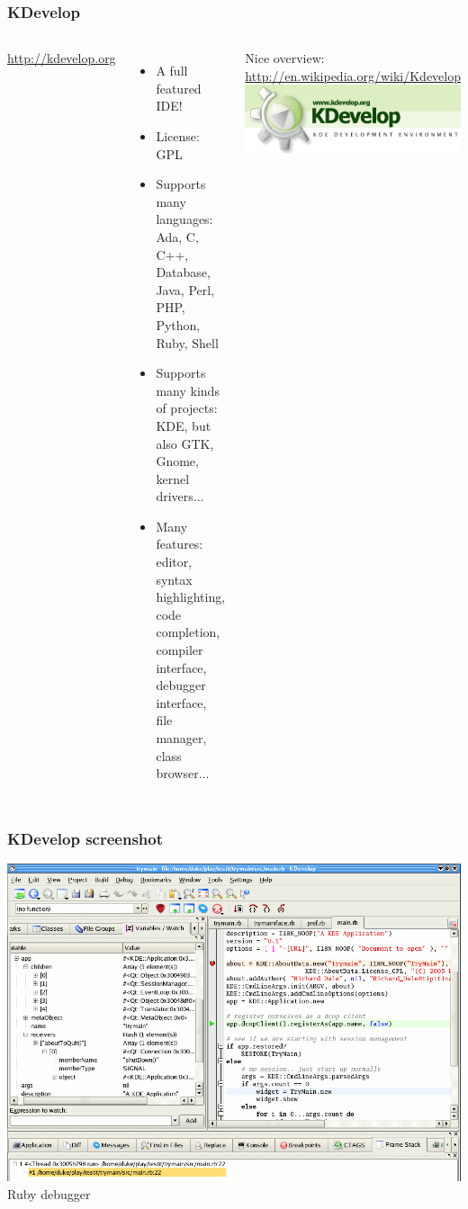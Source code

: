 \begin{frame}
  \frametitle{KDevelop}
  \begin{columns}[T]
    \url{http://kdevelop.org}
    \begin{itemize}
    \item A full featured IDE!
    \item License: GPL
    \item Supports many languages: Ada, C, C++, Database, Java, Perl,
      PHP, Python, Ruby, Shell
    \item Supports many kinds of projects: KDE, but also GTK, Gnome,
      kernel drivers...
    \item Many features: editor, syntax highlighting, code completion,
      compiler interface, debugger interface, file manager, class
      browser...
    \end{itemize}
    Nice overview: \url{http://en.wikipedia.org/wiki/Kdevelop}
    \includegraphics[width=\textwidth]{slides/sysdev-application-development/kdevelop.png}
  \end{columns}
\end{frame}

\begin{frame}
  \frametitle{KDevelop screenshot}
  \begin{center}
    \includegraphics[height=0.8\textheight]{slides/sysdev-application-development/kdevelop-screenshot.png}\\
    Ruby debugger
  \end{center}
\end{frame}

